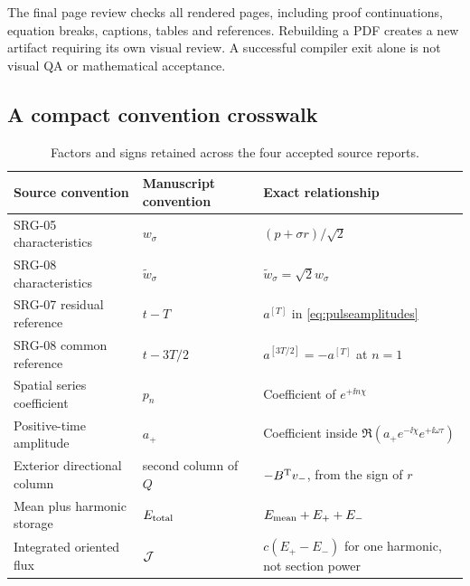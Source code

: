The final page review checks all rendered pages, including proof continuations, equation breaks, captions, tables and references. Rebuilding a PDF creates a new artifact requiring its own visual review. A successful compiler exit alone is not visual QA or mathematical acceptance.

\subsection{A compact convention crosswalk}\label{app:crosswalk}
\begin{table}[htbp]\centering\small
\begin{tabular}{P{.27\textwidth}P{.29\textwidth}P{.31\textwidth}}\toprule
Source convention & Manuscript convention & Exact relationship\\\midrule
SRG-05 characteristics & $w_\sigma$ & $(p+\sigma r)/\sqrt2$\\
SRG-08 characteristics & $\widetilde w_\sigma$ & $\widetilde w_\sigma=\sqrt2w_\sigma$\\
SRG-07 residual reference & $t-T$ & $a^{[T]}$ in \eqref{eq:pulseamplitudes}\\
SRG-08 common reference & $t-3T/2$ & $a^{[3T/2]}=-a^{[T]}$ at $n=1$\\
Spatial series coefficient & $p_n$ & Coefficient of $e^{+\ii n\chi}$\\
Positive-time amplitude & $a_+$ & Coefficient inside $\Re(a_+e^{-\ii\chi}e^{+\ii\omega\tau})$\\
Exterior directional column & second column of $Q$ & $-B^{\mathrm T} v_-$, from the sign of $r$\\
Mean plus harmonic storage & $E_{\rm total}$ & $E_{\rm mean}+E_++E_-$\\
Integrated oriented flux & $\mathcal J$ & $c(E_+-E_-)$ for one harmonic, not section power\\\bottomrule
\end{tabular}
\caption{Factors and signs retained across the four accepted source reports.}\label{tab:crosswalk}
\end{table}

\clearpage
